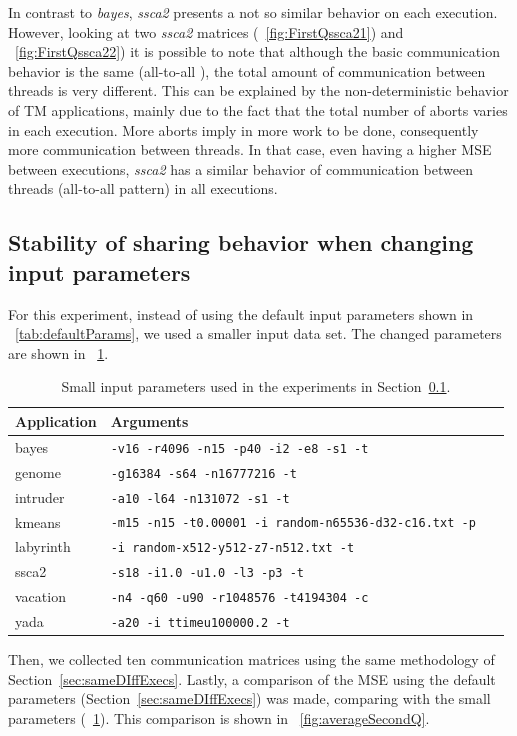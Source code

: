 In contrast to \emph{bayes}, \emph{ssca2} presents a not so similar behavior on each execution. However, looking at two \emph{ssca2} matrices (\figurename~\ref{fig:FirstQssca21}) and \figurename~\ref{fig:FirstQssca22}) it is possible to note that although the basic communication behavior is the same (all-to-all \cite{Williams:2009}), the total amount of communication between threads is very different. This can be explained by  the non-deterministic behavior of TM applications, mainly due to the fact that the total number of aborts varies in each execution. More aborts imply in more work to be done, consequently more communication between threads. In that case, even having a higher MSE between executions, \emph{ssca2} has a similar behavior of communication between threads (all-to-all pattern) in all executions.

\subsection{Stability of sharing behavior when changing input parameters}\label{sec:newInput}

For this experiment, instead of using the default input parameters shown in \tablename~\ref{tab:defaultParams}, we used a smaller input data set. The changed parameters are shown in \tablename~\ref{tab:changedParams}.
\begin{table}[!ht]
	\centering
	\caption{Small input parameters used in the experiments in Section~\ref{sec:newInput}.}
	\label{tab:changedParams}
	\begin{tabularx}{\textwidth}{@{}lXl@{}}
	\toprule
	Application & Arguments                                          \\ \midrule
	bayes                & \texttt{-v16 -r4096 -n15 -p40 -i2 -e8 -s1 -t \thNumber}                \\
	genome               & \texttt{-g16384 -s64 -n16777216 -t \thNumber}                         \\
	intruder             & \texttt{-a10 -l64 -n131072 -s1 -t \thNumber}                          \\
	kmeans               & \texttt{-m15 -n15 -t0.00001 -i random-n65536-d32-c16.txt -p \thNumber}\\
	labyrinth            & \texttt{-i random-x512-y512-z7-n512.txt -t \thNumber}               \\
	ssca2                & \texttt{-s18 -i1.0 -u1.0 -l3 -p3 -t \thNumber}                         \\
	vacation             & \texttt{-n4 -q60 -u90 -r1048576 -t4194304 -c \thNumber}              \\
	yada                 & \texttt{-a20 -i ttimeu100000.2 -t \thNumber}                          \\
	\bottomrule
\end{tabularx}
\end{table}
Then, we collected ten communication matrices using the same methodology of Section~\ref{sec:sameDIffExecs}. Lastly, a comparison of the MSE using the default parameters (Section~\ref{sec:sameDIffExecs}) was made, comparing with the small parameters (\tablename~\ref{tab:changedParams}). This comparison is shown in \figurename~\ref{fig:averageSecondQ}.

